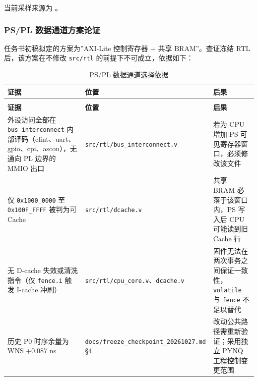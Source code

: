 
当前采样来源为 \pufresult。

\Needspace{85pt}

\subsubsection{PS/PL 数据通道方案论证}\label{pspl-ux6570ux636eux901aux9053ux65b9ux6848ux8bbaux8bc1}

任务书初稿拟定的方案为''AXI-Lite 控制寄存器 + 共享 BRAM''。查证冻结 RTL 后，该方案在不修改 \texttt{src/\allowbreak{}rtl} 的前提下不可成立，依据如下：

{\small
\setlength{\tabcolsep}{4pt}
\renewcommand{\thetable}{2-10}
\begin{longtable}{@{}>{\raggedright\arraybackslash}p{}>{\raggedright\arraybackslash}p{}>{\raggedright\arraybackslash}p{}@{}}
\caption{PS/PL 数据通道选择依据}\label{tab:2-10}\\
\toprule
\textbf{证据} & \textbf{位置} & \textbf{后果} \\
\midrule
\endfirsthead
\multicolumn{3}{@{}l}{\footnotesize 续表 2-10}\\
\toprule
\textbf{证据} & \textbf{位置} & \textbf{后果} \\
\midrule
\endhead
外设访问全部在 \texttt{bus\_\allowbreak{}\allowbreak{}interconnect} 内部译码（clint、uart、gpio、cpi、ascon），无通向 PL 边界的 MMIO 出口 & \texttt{src/\allowbreak{}rtl/\allowbreak{}bus\_\allowbreak{}\allowbreak{}interconnect.\allowbreak{}v} & 若为 CPU 增加 PS 可见寄存器窗口，必须修改该文件 \\
仅 \texttt{0x1000\_\allowbreak{}\allowbreak{}0000} 至 \texttt{0x100F\_\allowbreak{}\allowbreak{}FFFF} 被判为可 Cache & \texttt{src/\allowbreak{}rtl/\allowbreak{}dcache.\allowbreak{}v} & 共享 BRAM 必落于该窗口内，PS 写入后 CPU 可能读到旧 Cache 行 \\
无 D-cache 失效或清洗指令（仅 \texttt{fence.\allowbreak{}i} 触发 I-cache 冲刷） & \texttt{src/\allowbreak{}rtl/\allowbreak{}cpu\_\allowbreak{}\allowbreak{}core.\allowbreak{}v}、\texttt{dcache.\allowbreak{}v} & 固件无法在两次事务之间保证一致性，\texttt{volatile} 与 \texttt{fence} 不足以替代 \\
历史 P0 时序余量为 WNS +0.087 ns & \texttt{docs/\allowbreak{}freeze\_\allowbreak{}\allowbreak{}checkpoint\_\allowbreak{}\allowbreak{}20261027.\allowbreak{}md} §4 & 改动公共路径需重新验证；采用独立 PYNQ 工程控制变更范围 \\
\bottomrule
\end{longtable}
}

